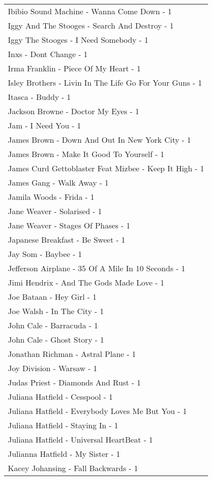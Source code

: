 \documentclass[
]{article}
\begin{document}
\begin{longtable}{l}
Ibibio Sound Machine - Wanna Come Down - 1 \\ 
Iggy And The Stooges - Search And Destroy - 1 \\ 
Iggy The Stooges - I Need Somebody - 1 \\ 
Inxs - Dont Change - 1 \\ 
Irma Franklin - Piece Of My Heart - 1 \\ 
Isley Brothers - Livin In The Life Go For Your Guns - 1 \\ 
Itasca - Buddy - 1 \\ 
Jackson Browne - Doctor My Eyes - 1 \\ 
Jam - I Need You - 1 \\ 
James Brown - Down And Out In New York City - 1 \\ 
James Brown - Make It Good To Yourself - 1 \\ 
James Curd Gettoblaster Feat Mizbee - Keep It High - 1 \\ 
James Gang - Walk Away - 1 \\ 
Jamila Woods - Frida - 1 \\ 
Jane Weaver - Solarised - 1 \\ 
Jane Weaver - Stages Of Phases - 1 \\ 
Japanese Breakfast - Be Sweet - 1 \\ 
Jay Som - Baybee - 1 \\ 
Jefferson Airplane - 35 Of A Mile In 10 Seconds - 1 \\ 
Jimi Hendrix - And The Gods Made Love - 1 \\ 
Joe Bataan - Hey Girl - 1 \\ 
Joe Walsh - In The City - 1 \\ 
John Cale - Barracuda - 1 \\ 
John Cale - Ghost Story - 1 \\ 
Jonathan Richman - Astral Plane - 1 \\ 
Joy Division - Warsaw - 1 \\ 
Judas Priest - Diamonds And Rust - 1 \\ 
Juliana Hatfield - Cesspool - 1 \\ 
Juliana Hatfield - Everybody Loves Me But You - 1 \\ 
Juliana Hatfield - Staying In - 1 \\ 
Juliana Hatfield - Universal HeartBeat - 1 \\ 
Julianna Hatfield - My Sister - 1 \\ 
Kacey Johansing - Fall Backwards - 1 \\ 

\end{longtable}
\end{document}
